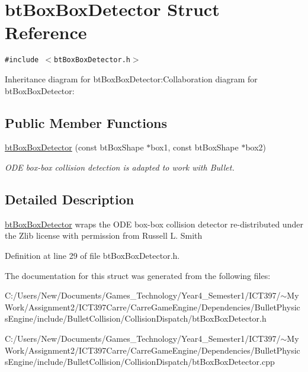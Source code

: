 \hypertarget{structbt_box_box_detector}{
\section{btBoxBoxDetector Struct Reference}
\label{structbt_box_box_detector}
}
{\tt \#include $<$btBoxBoxDetector.h$>$}

Inheritance diagram for btBoxBoxDetector:Collaboration diagram for btBoxBoxDetector:\subsection*{Public Member Functions}
\begin{CompactItemize}
\item 
\hypertarget{structbt_box_box_detector_9ab1be9748aeb7cfceb274768910c895}{
\hyperlink{structbt_box_box_detector_9ab1be9748aeb7cfceb274768910c895}{btBoxBoxDetector} (const btBoxShape $\ast$box1, const btBoxShape $\ast$box2)}
\label{structbt_box_box_detector_9ab1be9748aeb7cfceb274768910c895}

\begin{CompactList}\small\item\em ODE box-box collision detection is adapted to work with Bullet. \item\end{CompactList}\end{CompactItemize}


\subsection{Detailed Description}
\hyperlink{structbt_box_box_detector}{btBoxBoxDetector} wraps the ODE box-box collision detector re-distributed under the Zlib license with permission from Russell L. Smith 

Definition at line 29 of file btBoxBoxDetector.h.

The documentation for this struct was generated from the following files:\begin{CompactItemize}
\item 
C:/Users/New/Documents/Games\_\-Technology/Year4\_\-Semester1/ICT397/$\sim$My Work/Assignment2/ICT397Carre/CarreGameEngine/Dependencies/BulletPhysicsEngine/include/BulletCollision/CollisionDispatch/btBoxBoxDetector.h\item 
C:/Users/New/Documents/Games\_\-Technology/Year4\_\-Semester1/ICT397/$\sim$My Work/Assignment2/ICT397Carre/CarreGameEngine/Dependencies/BulletPhysicsEngine/include/BulletCollision/CollisionDispatch/btBoxBoxDetector.cpp\end{CompactItemize}
